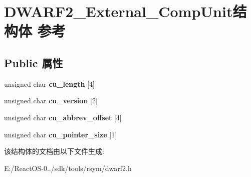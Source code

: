 \hypertarget{struct_d_w_a_r_f2___external___comp_unit}{}\section{D\+W\+A\+R\+F2\+\_\+\+External\+\_\+\+Comp\+Unit结构体 参考}
\label{struct_d_w_a_r_f2___external___comp_unit}
\subsection*{Public 属性}
\begin{DoxyCompactItemize}
\item 
\mbox{\label{struct_d_w_a_r_f2___external___comp_unit_a5691cc85804c2f139163b3fe8e03b00f}} 
unsigned char {\bfseries cu\+\_\+length} \mbox{[}4\mbox{]}
\item 
\mbox{\label{struct_d_w_a_r_f2___external___comp_unit_aa1c4cdd03805f9aed8b8dc8c000c6a5a}} 
unsigned char {\bfseries cu\+\_\+version} \mbox{[}2\mbox{]}
\item 
\mbox{\label{struct_d_w_a_r_f2___external___comp_unit_aa6ccefd778a7ae9f56f384611cc2e33e}} 
unsigned char {\bfseries cu\+\_\+abbrev\+\_\+offset} \mbox{[}4\mbox{]}
\item 
\mbox{\label{struct_d_w_a_r_f2___external___comp_unit_a3535f71781e54889810cfd6860862db3}} 
unsigned char {\bfseries cu\+\_\+pointer\+\_\+size} \mbox{[}1\mbox{]}
\end{DoxyCompactItemize}


该结构体的文档由以下文件生成\+:\begin{DoxyCompactItemize}
\item 
E\+:/\+React\+O\+S-\/0../sdk/tools/rsym/dwarf2.\+h\end{DoxyCompactItemize}
